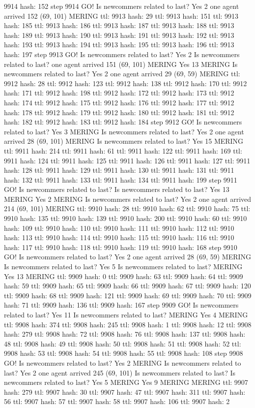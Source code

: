9914 hash: 152 step 9914 GO! Is newcommers related to last? Yes 2 one agent arrived 152 (69, 101) MERING ttl: 9913 hash: 29 ttl: 9913 hash: 151 ttl: 9913 hash: 185 ttl: 9913 hash: 186 ttl: 9913 hash: 187 ttl: 9913 hash: 188 ttl: 9913 hash: 189 ttl: 9913 hash: 190 ttl: 9913 hash: 191 ttl: 9913 hash: 192 ttl: 9913 hash: 193 ttl: 9913 hash: 194 ttl: 9913 hash: 195 ttl: 9913 hash: 196 ttl: 9913 hash: 197 step 9913 GO! Is newcommers related to last? Yes 2 Is newcommers related to last? one agent arrived 151 (69, 101) MERING Yes 13 MERING Is newcommers related to last? Yes 2 one agent arrived 29 (69, 59) MERING ttl: 9912 hash: 28 ttl: 9912 hash: 123 ttl: 9912 hash: 138 ttl: 9912 hash: 170 ttl: 9912 hash: 171 ttl: 9912 hash: 198 ttl: 9912 hash: 172 ttl: 9912 hash: 173 ttl: 9912 hash: 174 ttl: 9912 hash: 175 ttl: 9912 hash: 176 ttl: 9912 hash: 177 ttl: 9912 hash: 178 ttl: 9912 hash: 179 ttl: 9912 hash: 180 ttl: 9912 hash: 181 ttl: 9912 hash: 182 ttl: 9912 hash: 183 ttl: 9912 hash: 184 step 9912 GO! Is newcommers related to last? Yes 3 MERING Is newcommers related to last? Yes 2 one agent arrived 28 (69, 101) MERING Is newcommers related to last? Yes 15 MERING ttl: 9911 hash: 214 ttl: 9911 hash: 61 ttl: 9911 hash: 122 ttl: 9911 hash: 169 ttl: 9911 hash: 124 ttl: 9911 hash: 125 ttl: 9911 hash: 126 ttl: 9911 hash: 127 ttl: 9911 hash: 128 ttl: 9911 hash: 129 ttl: 9911 hash: 130 ttl: 9911 hash: 131 ttl: 9911 hash: 132 ttl: 9911 hash: 133 ttl: 9911 hash: 134 ttl: 9911 hash: 199 step 9911 GO! Is newcommers related to last? Is newcommers related to last? Yes 13 MERING Yes 2 MERING Is newcommers related to last? Yes 2 one agent arrived 214 (69, 101) MERING ttl: 9910 hash: 28 ttl: 9910 hash: 62 ttl: 9910 hash: 75 ttl: 9910 hash: 135 ttl: 9910 hash: 139 ttl: 9910 hash: 200 ttl: 9910 hash: 60 ttl: 9910 hash: 109 ttl: 9910 hash: 110 ttl: 9910 hash: 111 ttl: 9910 hash: 112 ttl: 9910 hash: 113 ttl: 9910 hash: 114 ttl: 9910 hash: 115 ttl: 9910 hash: 116 ttl: 9910 hash: 117 ttl: 9910 hash: 118 ttl: 9910 hash: 119 ttl: 9910 hash: 168 step 9910 GO! Is newcommers related to last? Yes 2 one agent arrived 28 (69, 59) MERING Is newcommers related to last? Yes 5 Is newcommers related to last? MERING Yes 13 MERING ttl: 9909 hash: 0 ttl: 9909 hash: 63 ttl: 9909 hash: 64 ttl: 9909 hash: 59 ttl: 9909 hash: 65 ttl: 9909 hash: 66 ttl: 9909 hash: 67 ttl: 9909 hash: 120 ttl: 9909 hash: 68 ttl: 9909 hash: 121 ttl: 9909 hash: 69 ttl: 9909 hash: 70 ttl: 9909 hash: 71 ttl: 9909 hash: 136 ttl: 9909 hash: 167 step 9909 GO! Is newcommers related to last? Yes 11 Is newcommers related to last? MERING Yes 4 MERING ttl: 9908 hash: 374 ttl: 9908 hash: 245 ttl: 9908 hash: 1 ttl: 9908 hash: 12 ttl: 9908 hash: 279 ttl: 9908 hash: 72 ttl: 9908 hash: 76 ttl: 9908 hash: 137 ttl: 9908 hash: 48 ttl: 9908 hash: 49 ttl: 9908 hash: 50 ttl: 9908 hash: 51 ttl: 9908 hash: 52 ttl: 9908 hash: 53 ttl: 9908 hash: 54 ttl: 9908 hash: 55 ttl: 9908 hash: 108 step 9908 GO! Is newcommers related to last? Yes 2 MERING Is newcommers related to last? Yes 2 one agent arrived 245 (69, 101) Is newcommers related to last? Is newcommers related to last? Yes 5 MERING Yes 9 MERING MERING ttl: 9907 hash: 279 ttl: 9907 hash: 30 ttl: 9907 hash: 47 ttl: 9907 hash: 311 ttl: 9907 hash: 56 ttl: 9907 hash: 57 ttl: 9907 hash: 58 ttl: 9907 hash: 106 ttl: 9907 hash: 2 